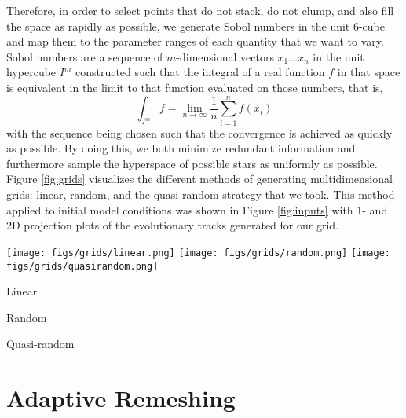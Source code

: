 \documentclass[twocolumn,twocolappendix]{aastex6}
\begin{document}
Therefore, in order to select points that do not stack, do not clump, and also fill the space as rapidly as possible, we generate Sobol numbers \citep{sobol1967distribution} in the unit 6-cube and map them to the parameter ranges of each quantity that we want to vary. Sobol numbers are a sequence of $m$-dimensional vectors $x_1 \ldots x_n$ in the unit hypercube $I^m$ constructed such that the integral of a real function $f$ in that space is equivalent in the limit to that function evaluated on those numbers, that is,
\begin{equation}
    \int_{I^m} f = \lim_{n \to \infty} \frac{1}{n}\sum_{i=1}^n f(x_i)
\end{equation}
with the sequence being chosen such that the convergence is achieved as quickly as possible. By doing this, we both minimize redundant information and furthermore sample the hyperspace of possible stars as uniformly as possible. Figure \ref{fig:grids} visualizes the different methods of generating multidimensional grids: linear, random, and the quasi-random strategy that we took. This method applied to initial model conditions was shown in Figure \ref{fig:inputs} with 1- and 2D projection plots of the evolutionary tracks generated for our grid. 

\begin{figure*}
    \centering
    \texttt{[image: figs/grids/linear.png]}\hfill
    \texttt{[image: figs/grids/random.png]}\hfill
    \texttt{[image: figs/grids/quasirandom.png]}\\
    \parbox{0.32\linewidth}{\centering Linear}\hfill
    \parbox{0.32\linewidth}{\centering Random}\hfill
    \parbox{0.32\linewidth}{\centering Quasi-random}
    \caption{Results of different methods for generating multidimensional grids portrayed via a unit cube projected onto a unit square. Linear (left), random (middle), and quasi-random (right) grids are generated in three dimensions, with color depicting the third dimension, i.e., the distance between the reader and the screen. From top to bottom, all three methods are shown with 100, 400, and 2000 points generated, respectively. }%
    \label{fig:grids}
\end{figure*}


\section{Adaptive Remeshing}
\label{sec:remeshing}
\end{document}
